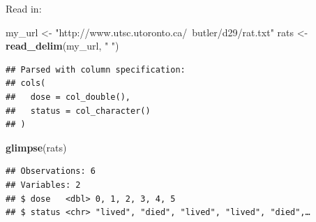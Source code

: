 \documentclass[ignorenonframetext,]{beamer}
\newenvironment{Shaded}{\begin{snugshade}}{\end{snugshade}}
\newcommand{\KeywordTok}[1]{\textcolor[rgb]{0.13,0.29,0.53}{\textbf{#1}}}
\newcommand{\NormalTok}[1]{#1}
\newcommand{\StringTok}[1]{\textcolor[rgb]{0.31,0.60,0.02}{#1}}
\begin{document}
\begin{frame}[fragile]{Read in:}
\protect\hypertarget{read-in}{}

\begin{Shaded}
\begin{Highlighting}[]
\NormalTok{my_url <-}\StringTok{ "http://www.utsc.utoronto.ca/~butler/d29/rat.txt"}
\NormalTok{rats <-}\StringTok{ }\KeywordTok{read_delim}\NormalTok{(my_url, }\StringTok{" "}\NormalTok{)}
\end{Highlighting}
\end{Shaded}

\begin{verbatim}
## Parsed with column specification:
## cols(
##   dose = col_double(),
##   status = col_character()
## )
\end{verbatim}

\begin{Shaded}
\begin{Highlighting}[]
\KeywordTok{glimpse}\NormalTok{(rats)}
\end{Highlighting}
\end{Shaded}

\begin{verbatim}
## Observations: 6
## Variables: 2
## $ dose   <dbl> 0, 1, 2, 3, 4, 5
## $ status <chr> "lived", "died", "lived", "lived", "died",…
\end{verbatim}

\end{frame}
\end{document}
